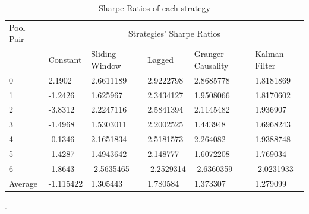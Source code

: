 \begin{table}[!htb]
    \centering
    \begin{adjustwidth}{-0.8in}{-0.9in}
        \begin{tabular}{|p{5em}|p{7em}|p{7em}|p{7em}|p{8em}|p{7em}|}\hline
            Pool Pair & \multicolumn{5}{|c|}{Strategies' Sharpe Ratios} \\\cline{1-6}
            & Constant & Sliding Window & Lagged & Granger Causality & Kalman Filter\\\cline{2-6}
            0 & 2.1902 & 2.6611189 & 2.9222798 & 2.8685778 & 1.8181869\\\cline{2-6}
            1 & -1.2426 & 1.625967 & 2.3434127 & 1.9508066 & 1.8170602\\\cline{2-6}
            2 & -3.8312 & 2.2247116 & 2.5841394 & 2.1145482 & 1.936907\\\cline{2-6}
            3 & -1.4968 & 1.5303011 & 2.2002525 & 1.443948 & 1.6968243\\\cline{2-6}
            4 & -0.1346 & 2.1651834 & 2.5181573 & 2.264082 & 1.9388748\\\cline{2-6}
            5 & -1.4287 & 1.4943642 & 2.148777 & 1.6072208 & 1.769034\\\cline{2-6}
            6 & -1.8643 & -2.5635465 & -2.2529314 & -2.6360359 & -2.0231933\\\hline\hline
            Average & -1.115422 & 1.305443 & 1.780584 & 1.373307 & 1.279099 \\\hline
        \end{tabular}
    \end{adjustwidth}
    \caption{Sharpe Ratios of each strategy \label{tab:sharpes}}.
\end{table}

